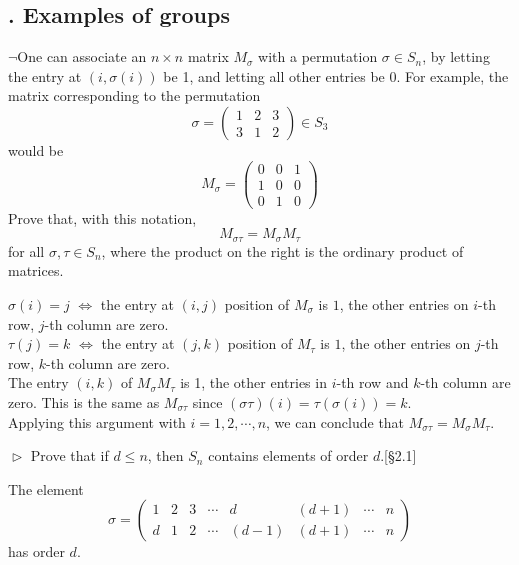 \subsection{. Examples of groups}

\begin{problem}[2.1]
$\neg$One can associate an $n\times n$ matrix $M_\sigma$ with a permutation $\sigma \in S_n$, by
        letting the entry at $(i, \sigma(i))$ be 1, and letting all other entries be 0. For example,
        the matrix corresponding to the permutation
        \[
        \sigma=\left(
        \begin{matrix}  
        1 & 2 & 3\\     
    3 & 1 & 2   
        \end{matrix}
        \right)\in S_3
        \]
        would be 
        \[
        M_\sigma=\left(
        \begin{matrix}  
        0 & 0 & 1\\     
        1 & 0 & 0\\     
        0 & 1 & 0
        \end{matrix}
        \right)
        \]
        Prove that, with this notation,
        \[
        M_{\sigma\tau}=M_{\sigma}M_{\tau}
        \]
        for all $\sigma,\tau\in S_n$, where the product on the right is the ordinary product of matrices.
\end{problem}
\begin{solution}
$\sigma(i) = j$ $\iff$ the entry at $(i,j)$ position of $M_{\sigma}$ is $1$, the other entries on $i$-th row, $j$-th column are zero.\\
$\tau(j) = k$ $\iff$ the entry at $(j,k)$ position of $M_{\tau}$ is $1$, the other entries on $j$-th row, $k$-th column are zero.\\
The entry $(i,k)$ of $M_{\sigma}M_{\tau}$ is 1, the other entries in $i$-th row and $k$-th column are zero. This is the same as $M_{\sigma\tau}$ since 
$(\sigma\tau)(i) = \tau(\sigma(i)) = k$.\\

\noindent Applying this  argument with $i=1,2, \cdots, n$, we can conclude that $M_{\sigma\tau}=M_{\sigma}M_{\tau}$.
\end{solution}

\begin{problem}[2.2]
 $\vartriangleright$ Prove that if $d \le n$, then $S_n$ contains elements of order $d$.[\S 2.1]
\end{problem}
\begin{solution}
The element 
 \[\sigma=\left(
        \begin{matrix}  
        1 & 2 & 3 & \cdots & d & (d+1) &\cdots & n\\     
    	d & 1 & 2 & \cdots & (d-1) &(d+1) &\cdots & n  
        \end{matrix}
        \right)
 \]
 has order $d$.  
\end{solution}

